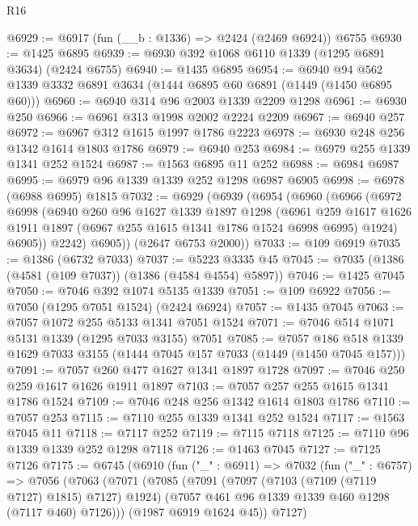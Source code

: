 \begin{lexlean}{R16}
\begin{coremodule}
@6929 := @6917 (fun (__b : @1336) => @2424 (@2469 @6924)) @6755
@6930 := @1425 @6895
@6939 := @6930 @392 @1068 @6110 @1339 (@1295 @6891 @3634) (@2424 @6755)
@6940 := @1435 @6895
@6954 := @6940 @94 @562 @1339 @3332 @6891 @3634 (@1444 @6895 @60 @6891 (@1449 (@1450 @6895 @60)))
@6960 := @6940 @314 @96 @2003 @1339 @2209 @1298
@6961 := @6930 @250
@6966 := @6961 @313 @1998 @2002 @2224 @2209
@6967 := @6940 @257
@6972 := @6967 @312 @1615 @1997 @1786 @2223
@6978 := @6930 @248 @256 @1342 @1614 @1803 @1786
@6979 := @6940 @253
@6984 := @6979 @255 @1339 @1341 @252 @1524
@6987 := @1563 @6895 @11 @252
@6988 := @6984 @6987
@6995 := @6979 @96 @1339 @1339 @252 @1298 @6987 @6905
@6998 := @6978 (@6988 @6995) @1815
@7032 := @6929
    (@6939
      (@6954
        (@6960
          (@6966
            (@6972
              @6998
              (@6940
                @260
                @96
                @1627
                @1339
                @1897
                @1298
                (@6961
                  @259
                  @1617
                  @1626
                  @1911
                  @1897
                  (@6967 @255 @1615 @1341 @1786 @1524 @6998 @6995)
                  @1924)
                @6905))
            @2242)
          @6905))
      (@2647 @6753 @2000))
@7033 := @109 @6919
@7035 := @1386 (@6732 @7033)
@7037 := @5223 @3335 @45
@7045 := @7035 (@1386 (@4581 (@109 @7037)) (@1386 (@4584 @4554) @5897))
@7046 := @1425 @7045
@7050 := @7046 @392 @1074 @5135 @1339
@7051 := @109 @6922
@7056 := @7050 (@1295 @7051 @1524) (@2424 @6924)
@7057 := @1435 @7045
@7063 := @7057 @1072 @255 @5133 @1341 @7051 @1524
@7071 := @7046 @514 @1071 @5131 @1339 (@1295 @7033 @3155) @7051
@7085 := @7057 @186 @518 @1339 @1629 @7033 @3155 (@1444 @7045 @157 @7033 (@1449 (@1450 @7045 @157)))
@7091 := @7057 @260 @477 @1627 @1341 @1897 @1728
@7097 := @7046 @250 @259 @1617 @1626 @1911 @1897
@7103 := @7057 @257 @255 @1615 @1341 @1786 @1524
@7109 := @7046 @248 @256 @1342 @1614 @1803 @1786
@7110 := @7057 @253
@7115 := @7110 @255 @1339 @1341 @252 @1524
@7117 := @1563 @7045 @11
@7118 := @7117 @252
@7119 := @7115 @7118
@7125 := @7110 @96 @1339 @1339 @252 @1298 @7118
@7126 := @1463 @7045
@7127 := @7125 @7126
@7175 := @6745
    (@6910
      (fun ("_" : @6911) =>
      @7032
        (fun ("_" : @6757) =>
        @7056
          (@7063
            (@7071
              (@7085
                (@7091
                  (@7097 (@7103 (@7109 (@7119 @7127) @1815) @7127) @1924)
                  (@7057 @461 @96 @1339 @1339 @460 @1298 (@7117 @460) @7126)))
              (@1987 @6919 @1624 @45))
            @7127)

\end{coremodule}
\end{lexlean}
